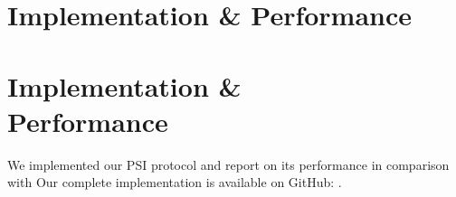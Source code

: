\iffullversion
\section{Implementation \& Performance}
\else
\section{Implementation \& \\ Performance}
\fi
\label{sec:performance}

We implemented our PSI protocol and report on its performance in comparison with 
Our complete implementation is available on GitHub: \todo{\url{}}.
